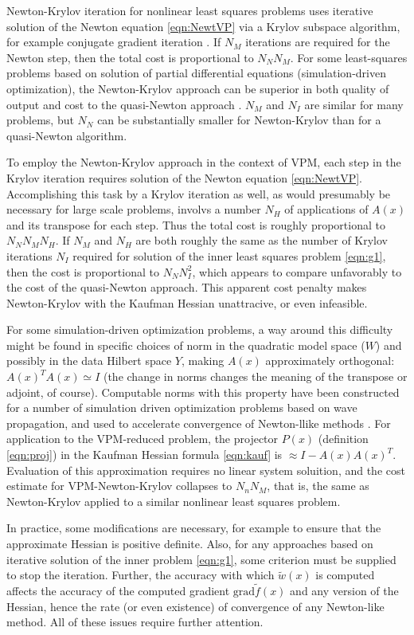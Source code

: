 Newton-Krylov iteration for nonlinear least squares problems uses iterative solution of the Newton equation \ref{eqn:NewtVP} via a Krylov subspace algorithm, for example conjugate gradient iteration \cite[]{Ghattas:IP25}. If $N_M$ iterations are required for the Newton step, then the total cost is proportional to $N_NN_M$.  For some least-squares problems based on solution of partial differential equations (simulation-driven optimization), the Newton-Krylov approach can be superior in both quality of output and cost to the quasi-Newton approach \cite[]{Metivier:2014}. $N_M$ and $N_I$ are similar for many problems, but $N_N$ can be substantially smaller for Newton-Krylov than for a quasi-Newton algorithm.

To employ the Newton-Krylov approach in the context of VPM, each step in the Krylov iteration requires solution of the Newton equation \ref{eqn:NewtVP}. Accomplishing this task by a Krylov iteration as well, as would presumably be necessary for large scale problems, involvs a number $N_H$ of applications of $A(x)$ and its transpose for each step. Thus the total cost is roughly proportional to $N_NN_MN_H$. If $N_M$ and $N_H$ are both roughly the same as the number of Krylov iterations $N_I$ required for solution of the inner least squares problem \ref{eqn:g1}, then the cost is proportional to $N_NN_I^2$, which appears to compare unfavorably to the cost of the quasi-Newton approach. This apparent cost penalty makes Newton-Krylov with the Kaufman Hessian unattracive, or even infeasible.

For some simulation-driven optimization problems, a way around this difficulty might be found in specific choices of norm in the quadratic model space ($W$) and possibly in the data Hilbert space $Y$, making $A(x)$ approximately orthogonal: $A(x)^TA(x) \simeq I$ (the change in norms changes the meaning of the transpose or adjoint, of course). Computable norms with this property have been constructed for a number of simulation driven optimization problems based on wave propagation, and used to accelerate convergence of Newton-llike methods \cite[]{HouSymes:16,Herve2017,DafniSymes:SEG18b}. For application to the VPM-reduced problem, the projector $P(x)$ (definition \ref{eqn:proj}) in the Kaufman Hessian formula \ref{eqn:kauf} is $\approx I-A(x)A(x)^T$. Evaluation of this approximation requires no linear system soluition, and the cost estimate for VPM-Newton-Krylov collapses to $N_nN_M$, that is, the same as Newton-Krylov applied to a similar nonlinear least squares problem.

In practice, some modifications are necessary, for example to ensure that the approximate Hessian is positive definite. Also, for any approaches based on iterative solution of the inner problem \ref{eqn:g1}, some criterion must be supplied to stop the iteration. Further, the accuracy with which $\tilde{w}(x)$ is computed affects the accuracy of the computed gradient $\mbox{grad} \tilde{f}(x)$ and any version of the Hessian, hence the rate (or even existence) of convergence of any Newton-like method. All of these issues require further attention.





